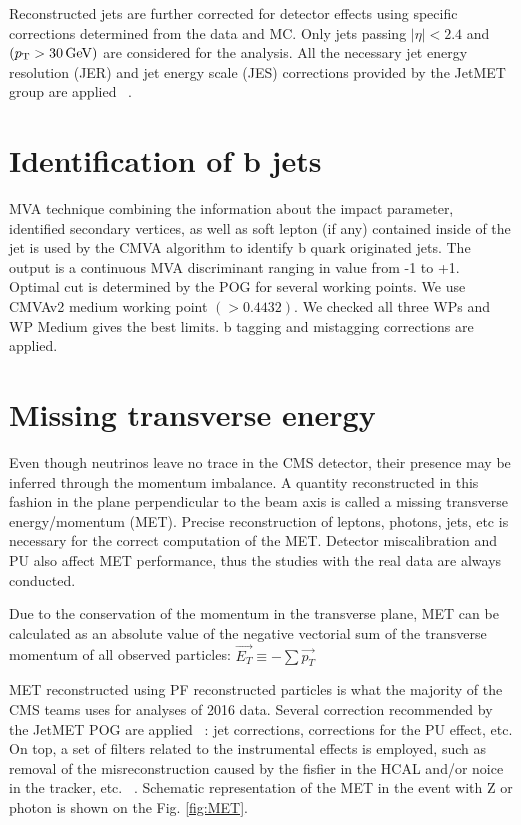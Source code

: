     Reconstructed jets are further corrected for detector effects using specific corrections determined from the data and MC. Only jets passing $|\eta|<2.4$ and  $(p_{\mathrm{T}} > 30\,\text{Ge\hspace{-.08em}V})$ are considered for the analysis. 
    All the necessary jet energy resolution (JER) and jet energy scale (JES) corrections provided by the JetMET group are applied ~\cite{JetMETgroup}.


\section{Identification of b jets\label{sec:bjets}}
MVA technique combining the information about the impact parameter, identified secondary vertices, as well as soft lepton (if any) contained inside of the jet is used by the CMVA algorithm to identify b quark originated jets. The output is a continuous MVA discriminant ranging in value from -1 to +1. Optimal cut is determined by the POG for several working points. We use CMVAv2 medium working point  $(>0.4432)$. We checked all three WPs and WP Medium gives the best limits. b tagging and mistagging corrections are applied.



\section{Missing transverse energy}\label{sec:MET}
Even though neutrinos leave no trace in the CMS detector, their presence may be inferred through the momentum imbalance. A quantity reconstructed in this fashion in the plane perpendicular to the beam axis is called a missing transverse energy/momentum (MET). Precise reconstruction of leptons, photons, jets, etc is necessary for the correct computation of the MET. Detector miscalibration and PU also affect MET performance, thus the studies with the real data are always conducted.   

Due to the conservation of the momentum in the transverse plane, MET can be calculated as an absolute value of the negative vectorial sum of the transverse momentum of all observed particles:  
$\overrightarrow{E_T} \equiv -\sum \overrightarrow{p_T}$

MET reconstructed using PF reconstructed particles \cite{PF_MET} is what the majority of the CMS teams uses for analyses of 2016 data.  
Several correction recommended by the JetMET POG are applied ~\cite{MissingETRun2Corrections}: jet corrections, corrections for the PU effect, etc. On top, a set of filters related to the instrumental effects is employed, such as removal of the misreconstruction caused by the fisfier in the HCAL and/or noice in the tracker, etc.  ~\cite{MissingETOptionalFiltersRun2}. Schematic representation of the MET in the event with Z or photon is shown on the Fig. \ref{fig:MET}.


